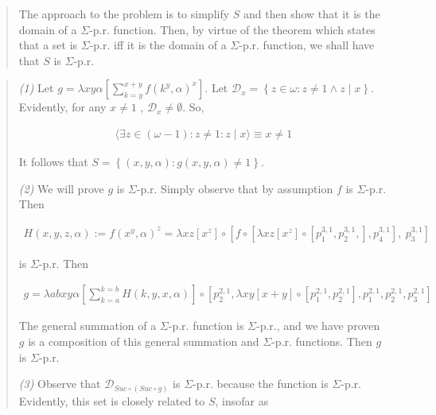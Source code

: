 \documentclass[a4paper, 12pt]{article}
\begin{document}
\footnotesize
\begin{quote}

The approach to the problem is to simplify $S$ and then show that it is the
domain of a $\Sigma$-p.r. function. Then, by virtue of the theorem which states
that a set is $\Sigma$-p.r. iff it is the domain of a $\Sigma$-p.r. function, we
shall have that $S$ is $\Sigma$-p.r. 

\end{quote}
\normalsize


\small
\begin{quote}


\textit{(1)} Let $g = \lambda xy \alpha \left[ \sum_{k=y}^{x + y}f(k^y, \alpha)^x  \right]$.
Let $\mathscr{D}_x = \left\{ z \in \omega : z \neq 1 \land z \mid x \right\} $.
Evidently, for any $x \neq 1$ , $\mathscr{D}_x \neq \emptyset$.  So,

\begin{align*}
    \langle \exists z \in \left( \omega - 1 \right)  :  z \neq 1 : z \mid x
    \rangle \equiv x \neq 1
\end{align*}

It follows that $S = \left\{ (x, y, \alpha) : g(x, y, \alpha) \neq 1 \right\} $. 

\textit{(2)} We will prove $g$ is $\Sigma$-p.r. Simply observe that by
assumption $f$ is $\Sigma$-p.r. Then 

\begin{align*}
    H(x, y, z, \alpha) := f(x^y, \alpha)^z  = \lambda xz \left[ x^z  \right] \circ \left[ f \circ
    \left[ \lambda xz \left[  x^z \right] \circ \left[ p_1^{3, 1}, p_2^{3, 1},
\right], p_4^{3, 1}  \right], ~ p_3^{3, 1} \right] 
\end{align*}

is $\Sigma$-p.r. Then

\begin{align*}
    g = \lambda abxy\alpha \left[ \sum_{k=a}^{k = b} H(k, y, x, \alpha)  \right] \circ
    \left[ p_2^{2, 1}, \lambda xy \left[ x + y  \right] \circ \left[ p_1^{2, 1},
    p_2^{2, 1}\right], p_1^{2, 1}, p_2^{2, 1}, p_3^{2, 1}    \right] 
\end{align*}

The general summation of a $\Sigma$-p.r. function is $\Sigma$-p.r., and we have
proven $g$ is a composition of this general summation and $\Sigma$-p.r.
functions. Then $g$ is $\Sigma$-p.r. 

\textit{(3)} Observe that $\mathcal{D}_{Suc \circ (Suc \circ g)}$ is
$\Sigma$-p.r. because the function is $\Sigma$-p.r. Evidently, this set is
closely related to $S$, insofar as


\end{quote}
\end{document}
